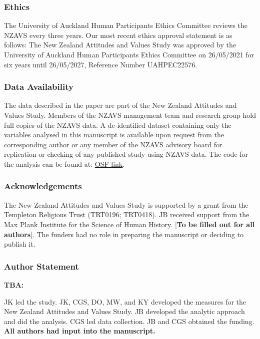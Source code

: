 \documentclass[
  single column]{article}
\begin{document}
\newpage{}

\subsubsection{Ethics}\label{ethics}

The University of Auckland Human Participants Ethics Committee reviews
the NZAVS every three years. Our most recent ethics approval statement
is as follows: The New Zealand Attitudes and Values Study was approved
by the University of Auckland Human Participants Ethics Committee on
26/05/2021 for six years until 26/05/2027, Reference Number UAHPEC22576.

\subsubsection{Data Availability}\label{data-availability}

The data described in the paper are part of the New Zealand Attitudes
and Values Study. Members of the NZAVS management team and research
group hold full copies of the NZAVS data. A de-identified dataset
containing only the variables analysed in this manuscript is available
upon request from the corresponding author or any member of the NZAVS
advisory board for replication or checking of any published study using
NZAVS data. The code for the analysis can be found at:
\href{https://osf.io/wgtz4/}{OSF link}.

\subsubsection{Acknowledgements}\label{acknowledgements}

The New Zealand Attitudes and Values Study is supported by a grant from
the Templeton Religious Trust (TRT0196; TRT0418). JB received support
from the Max Plank Institute for the Science of Human History.
{[}\textbf{To be filled out for all authors}{]}. The funders had no role
in preparing the manuscript or deciding to publish it.

\subsubsection{Author Statement}\label{author-statement}

\textbf{TBA:}

JK led the study. JK, CGS, DO, MW, and KY developed the measures for the
New Zealand Attitudes and Values Study. JB developed the analytic
approach and did the analysis. CGS led data collection. JB and CGS
obtained the funding. \textbf{All authors had input into the
manuscript.}
\end{document}
